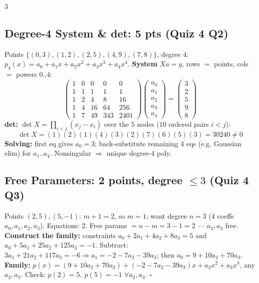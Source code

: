\documentclass[9pt]{extarticle}
\newcommand{\hl}[1]{\textbf{\textcolor{BrickRed}{#1}}}
\begin{document}
\begin{multicols}{3}
\subsection{Degree-4 System \& det: 5 pts (Quiz 4 Q2)}
Points $\{(0,3),(1,2),(2,5),(4,9),(7,8)\}$, degree 4: $p_4(x)=a_0+a_1x+a_2x^2+a_3x^3+a_4x^4$.
\hl{System} $Xa=y$, rows $=$ points, cols $=$ powers $0..4$:
{\footnotesize
\begin{equation*}
\begin{pmatrix}1&0&0&0&0\\ 1&1&1&1&1\\ 1&2&4&8&16\\ 1&4&16&64&256\\ 1&7&49&343&2401\end{pmatrix}\!
\begin{pmatrix}a_0\\a_1\\a_2\\a_3\\a_4\end{pmatrix}
=\!\begin{pmatrix}3\\2\\5\\9\\8\end{pmatrix}
\end{equation*}
}
\hl{det:} $\det X=\prod_{i<j}(x_j-x_i)$ over the $5$ nodes ($10$ ordered pairs $i<j$):
\begin{equation*}
\det X=(1)(2)(1)(4)(3)(2)(7)(6)(5)(3)=30240\ne0
\end{equation*}
\hl{Solving:} first eq gives $a_0=3$; back-substitute remaining 4 eqs (e.g. Gaussian elim) for $a_1..a_4$. Nonsingular $\Rightarrow$ unique degree-4 poly.

\subsection{Free Parameters: 2 points, degree $\le3$ (Quiz 4 Q3)}
Points $(2,5),(5,-1)$: $m+1=2$, so $m=1$; want degree $n=3$ (4 coeffs $a_0,a_1,a_2,a_3$). Equations: 2. Free params $=n-m=3-1=2$ — $a_2,a_3$ free.
\hl{Construct the family:} constraints $a_0+2a_1+4a_2+8a_3=5$ and $a_0+5a_1+25a_2+125a_3=-1$. Subtract: $3a_1+21a_2+117a_3=-6\Rightarrow a_1=-2-7a_2-39a_3$; then $a_0=9+10a_2+70a_3$.
\hl{Family:} $p(x)=(9{+}10a_2{+}70a_3)+(-2{-}7a_2{-}39a_3)x+a_2x^2+a_3x^3$, any $a_2,a_3$. Check: $p(2)=5,\ p(5)=-1$ $\forall a_2,a_3$. $\square$


\end{multicols}
\end{document}
